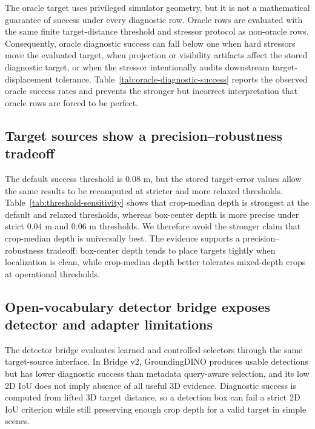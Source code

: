 The oracle target uses privileged simulator geometry, but it is not a mathematical guarantee of success under every diagnostic row. Oracle rows are evaluated with the same finite target-distance threshold and stressor protocol as non-oracle rows. Consequently, oracle diagnostic success can fall below one when hard stressors move the evaluated target, when projection or visibility artifacts affect the stored diagnostic target, or when the stressor intentionally audits downstream target-displacement tolerance. Table~\ref{tab:oracle-diagnostic-success} reports the observed oracle success rates and prevents the stronger but incorrect interpretation that oracle rows are forced to be perfect.



\subsection{Target sources show a precision--robustness tradeoff}

The default success threshold is 0.08 m, but the stored target-error values allow the same results to be recomputed at stricter and more relaxed thresholds. Table~\ref{tab:threshold-sensitivity} shows that crop-median depth is strongest at the default and relaxed thresholds, whereas box-center depth is more precise under strict 0.04 m and 0.06 m thresholds. We therefore avoid the stronger claim that crop-median depth is universally best. The evidence supports a precision--robustness tradeoff: box-center depth tends to place targets tightly when localization is clean, while crop-median depth better tolerates mixed-depth crops at operational thresholds.



\subsection{Open-vocabulary detector bridge exposes detector and adapter limitations}

The detector bridge evaluates learned and controlled selectors through the same target-source interface. In Bridge v2, GroundingDINO produces usable detections but has lower diagnostic success than metadata query-aware selection, and its low 2D IoU does not imply absence of all useful 3D evidence. Diagnostic success is computed from lifted 3D target distance, so a detection box can fail a strict 2D IoU criterion while still preserving enough crop depth for a valid target in simple scenes.

